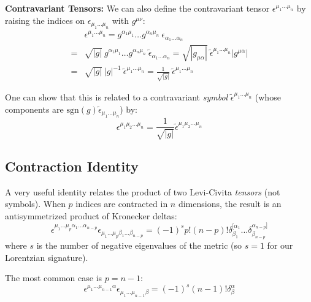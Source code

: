 \documentclass[11pt, a4paper]{report}
\begin{document}
\textbf{Contravariant Tensors:}
We can also define the contravariant tensor $\epsilon^{\mu_1\dots\mu_n}$ by raising the indices on $\epsilon_{\mu_1\dots\mu_n}$ with $g^{\mu\nu}$:
\begin{align*}
    &\epsilon^{\mu_1\dots\mu_n} =g^{\alpha_1 \mu_1}\dots g^{\alpha_n \mu_n} \ \epsilon_{\alpha_1\dots\alpha_n}\\
    =& \sqrt{|g|} \ g^{\alpha_1 \mu_1}\dots g^{\alpha_n \mu_n} \ \tilde{\epsilon}_{\alpha_1\dots\alpha_n} = \sqrt{|g_{\mu \alpha}|} \ \tilde{\epsilon}^{\mu_1\dots\mu_n} |g^{\mu \alpha}|\\
    =& \sqrt{|g|} \ |g|^{-1} \ \tilde{\epsilon}^{\mu_1\dots\mu_n} = \frac{1}{\sqrt{|g|}} \ \tilde{\epsilon}^{\mu_1\dots\mu_n}
\end{align*}

One can show that this is related to a contravariant \emph{symbol} $\tilde{\epsilon}^{\mu_1\dots\mu_n}$ (whose components are $\text{sgn}(g)\tilde{\epsilon}_{\mu_1\dots\mu_n}$) by:
\begin{equation}
    \epsilon^{\mu_1\mu_2\dots\mu_n} = \frac{1}{\sqrt{|g|}} \tilde{\epsilon}^{\mu_1\mu_2\dots\mu_n}
\end{equation}


\subsection*{Contraction Identity}
A very useful identity relates the product of two Levi-Civita \emph{tensors} (not symbols). When $p$ indices are contracted in $n$ dimensions, the result is an antisymmetrized product of Kronecker deltas:
\begin{equation}
    \epsilon^{\mu_1\dots\mu_p\alpha_1\dots\alpha_{n-p}} \epsilon_{\mu_1\dots\mu_p\beta_1\dots\beta_{n-p}} = 
    (-1)^s p! (n-p)! \delta^{[\alpha_1}_{\beta_1} \dots \delta^{\alpha_{n-p}]}_{\beta_{n-p}}
\end{equation}
where $s$ is the number of negative eigenvalues of the metric (so $s=1$ for our Lorentzian signature).

The most common case is $p = n-1$:
\begin{equation}
    \epsilon^{\mu_1\dots\mu_{n-1}\alpha} \epsilon_{\mu_1\dots\mu_{n-1}\beta} = (-1)^s (n-1)! \delta^\alpha_\beta
\end{equation}
\end{document}
